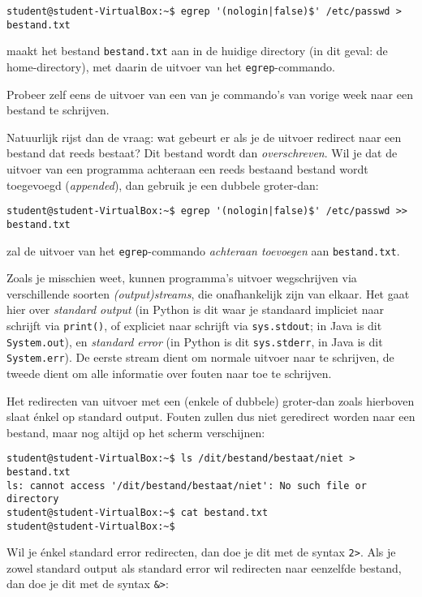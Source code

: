 \documentclass[a4paper,twoside,openany]{memoir}
\begin{document}
\begin{verbatim}
student@student-VirtualBox:~$ egrep '(nologin|false)$' /etc/passwd > bestand.txt
\end{verbatim}

maakt het bestand \verb!bestand.txt! aan in de huidige directory (in dit geval:
de home-directory), met daarin de uitvoer van het \verb!egrep!-commando.

Probeer zelf eens de uitvoer van een van je commando's van vorige week naar een
bestand te schrijven.

Natuurlijk rijst dan de vraag: wat gebeurt er als je de uitvoer redirect naar
een bestand dat reeds bestaat? Dit bestand wordt dan \emph{overschreven}. Wil je
dat de uitvoer van een programma achteraan een reeds bestaand bestand wordt
toegevoegd (\emph{appended}), dan gebruik je een dubbele groter-dan:

\begin{verbatim}
student@student-VirtualBox:~$ egrep '(nologin|false)$' /etc/passwd >> bestand.txt
\end{verbatim}

zal de uitvoer van het \verb!egrep!-commando \emph{achteraan toevoegen} aan
\verb!bestand.txt!.

Zoals je misschien weet, kunnen programma's uitvoer wegschrijven via
verschillende soorten \emph{(output)streams}, die onafhankelijk zijn van elkaar.
Het gaat hier over \emph{standard output} (in Python is dit waar je standaard
impliciet naar schrijft via \verb!print()!, of expliciet naar schrijft via
\verb!sys.stdout!; in Java is dit \verb!System.out!), en \emph{standard error}
(in Python is dit \verb!sys.stderr!, in Java is dit \verb!System.err!). De
eerste stream dient om normale uitvoer naar te schrijven, de tweede dient om
alle informatie over fouten naar toe te schrijven.

Het redirecten van uitvoer met een (enkele of dubbele) groter-dan zoals
hierboven slaat énkel op standard output. Fouten zullen dus niet geredirect
worden naar een bestand, maar nog altijd op het scherm verschijnen:

\begin{verbatim}
student@student-VirtualBox:~$ ls /dit/bestand/bestaat/niet > bestand.txt
ls: cannot access '/dit/bestand/bestaat/niet': No such file or directory
student@student-VirtualBox:~$ cat bestand.txt
student@student-VirtualBox:~$
\end{verbatim}

Wil je énkel standard error redirecten, dan doe je dit met de syntax \verb!2>!.
Als je zowel standard output als standard error wil redirecten naar eenzelfde
bestand, dan doe je dit met de syntax \verb!&>!:
\end{document}
